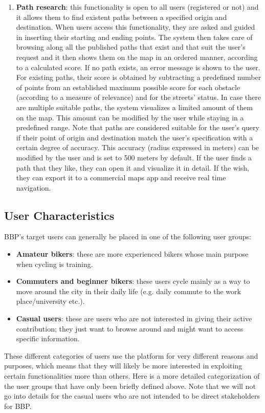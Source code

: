 \documentclass{article}
\begin{document}
\begin{enumerate}
    \item \textbf{Path research}: this functionality is open to all users (registered or not) and it allows them to find existent paths between a specified origin and destination. When users access this functionality, they are asked and guided in inserting their starting and ending points. The system then takes care of browsing along all the published paths that exist and that suit the user's request and it then shows them on the map in an ordered manner, according to a calculated score. If no path exists, an error message is shown to the user. For existing paths, their score is obtained by subtracting a predefined number of points from an established maximum possible score for each obstacle (according to a measure of relevance) and for the streets' status. In case there are multiple suitable paths, the system visualizes a limited amount of them on the map. This amount can be modified by the user while staying in a predefined range. Note that paths are considered suitable for the user's query if their point of origin and destination match the user's specification with a certain degree of accuracy. This accuracy (radius expressed in meters) can be modified by the user and is set to 500 meters by default. If the user finds a path that they like, they can open it and visualize it in detail. If the wish, they can export it to a commercial maps app and receive real time navigation.
\end{enumerate}

\subsection{User Characteristics}
BBP's target users can generally be placed in one of the following user groups: 
\begin{itemize}
    \item \textbf{Amateur bikers}: these are more experienced bikers whose main purpose when cycling is training. 
    \item \textbf{Commuters and beginner bikers}: these users cycle mainly as a way to move around the city in their daily life (e.g. daily commute to the work place/university etc.).
    \item \textbf{Casual users}: these are users who are not interested in giving their active contribution; they just want to browse around and might want to access specific information.
\end{itemize}
These different categories of users use the platform for very different reasons and purposes, which means that they will likely be more interested in exploiting certain functionalities more than others. Here is a more detailed categorization of the user groups that have only been briefly defined above. Note that we will not go into details for the casual users who are not intended to be direct stakeholders for BBP.
\end{document}
